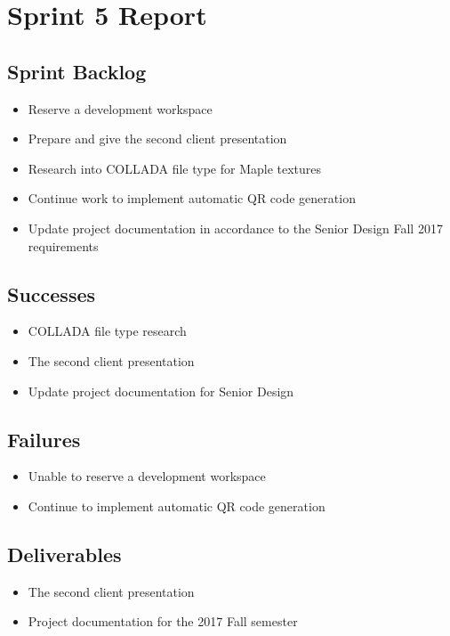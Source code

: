 
\section{Sprint 5 Report}
\label{sec:Sprint5_report}
    \subsection{Sprint Backlog}
    \label{sec:Sprint5_backlog}
        \begin{itemize}
            \item Reserve a development workspace
            \item Prepare and give the second client presentation            
            \item Research into COLLADA file type for Maple textures
            \item Continue work to implement automatic QR code generation
            \item Update project documentation in accordance to the Senior Design Fall 2017 requirements
        \end{itemize}

    \subsection{Successes}
    \label{sec:Sprint5_successes}
        \begin{itemize}
            \item COLLADA file type research
            \item The second client presentation
            \item Update project documentation for Senior Design
        \end{itemize}

    \subsection{Failures}
    \label{sec:Sprint5_failures}
        \begin{itemize}
            \item Unable to reserve a development workspace
            \item Continue to implement automatic QR code generation
        \end{itemize}

    \subsection{Deliverables}
    \label{sec:Sprint5_deliverables}
        \begin{itemize}
            \item The second client presentation
            \item Project documentation for the 2017 Fall semester
        \end{itemize}

